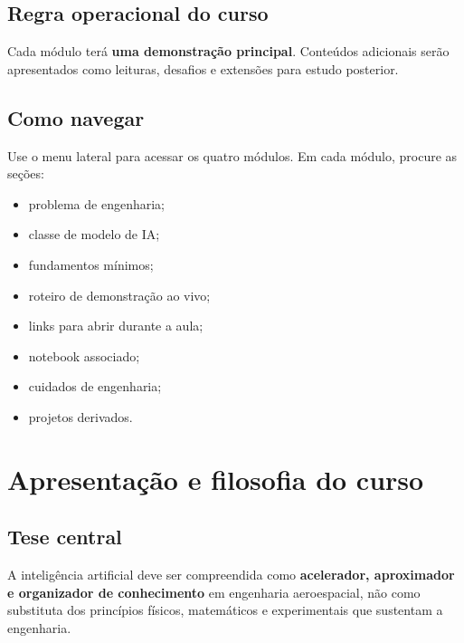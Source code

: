 \documentclass[
  brazilian,
  a4paper,
  DIV=11,
  numbers=noendperiod]{scrreprt}
\providecommand{\tightlist}{%
  \setlength{\itemsep}{0pt}\setlength{\parskip}{0pt}}
\begin{document}
\section*{Regra operacional do curso}\label{regra-operacional-do-curso}


Cada módulo terá \textbf{uma demonstração principal}. Conteúdos
adicionais serão apresentados como leituras, desafios e extensões para
estudo posterior.

\section*{Como navegar}\label{como-navegar}


Use o menu lateral para acessar os quatro módulos. Em cada módulo,
procure as seções:

\begin{itemize}
\tightlist
\item
  problema de engenharia;
\item
  classe de modelo de IA;
\item
  fundamentos mínimos;
\item
  roteiro de demonstração ao vivo;
\item
  links para abrir durante a aula;
\item
  notebook associado;
\item
  cuidados de engenharia;
\item
  projetos derivados.
\end{itemize}


\chapter{Apresentação e filosofia do
curso}\label{apresentauxe7uxe3o-e-filosofia-do-curso}

\section{Tese central}\label{tese-central}

A inteligência artificial deve ser compreendida como \textbf{acelerador,
aproximador e organizador de conhecimento} em engenharia aeroespacial,
não como substituta dos princípios físicos, matemáticos e experimentais
que sustentam a engenharia.
\end{document}
